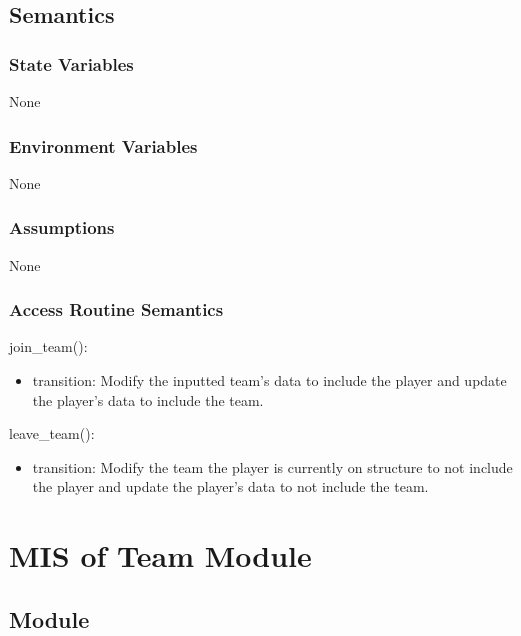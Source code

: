 \documentclass[12pt, titlepage]{article}
\begin{document}
\subsection{Semantics}

\subsubsection{State Variables}

None

\subsubsection{Environment Variables}

None

\subsubsection{Assumptions}


None

\subsubsection{Access Routine Semantics}

\noindent join\_team():
\begin{itemize}
\item transition: Modify the inputted team's data to include the player and
update the player's data to include the team.
\end{itemize}

\noindent leave\_team():
\begin{itemize}
\item transition: Modify the team the player is currently on structure to not
include the player and update the player's data to not include the team.
\end{itemize}

\newpage

\section{MIS of Team Module} \label{mTE}

\subsection{Module}
\end{document}
